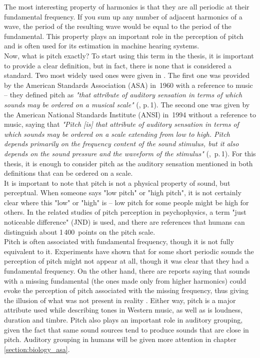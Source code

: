The most interesting property of harmonics is that they are all periodic at their fundamental frequency. If you sum up any number of adjacent harmonics of a wave, the period of the resulting wave would be equal to the period of the fundamental. This property plays an important role in the perception of pitch and is often used for its estimation in machine hearing systems.\\

Now, what is pitch exactly? To start using this term in the thesis, it is important to provide a clear definition, but in fact, there is none that is considered a standard. Two most widely used ones were given in \cite{Plack2005}. The first one was provided by the American Standards Association (ASA) in~1960 with a reference to music -- they defined pitch as \textit{"that attribute of auditory sensation in terms of which sounds may be ordered on a musical scale"} (\cite{Plack2005}, p.\,1). The second one was given by the American National Standards Institute (ANSI) in~1994 without a reference to music, saying that \textit{"Pitch [is] that attribute of auditory sensation in terms of which sounds may be ordered on a scale extending from low to high. Pitch depends primarily on the frequency content of the sound stimulus, but it also depends on the sound pressure and the waveform of the stimulus"} (\cite{Plack2005},~p.\,1). For this thesis, it is enough to consider pitch as the auditory sensation mentioned in both definitions that can be ordered on a scale.\\

It is important to note that pitch is not a physical property of sound, but perceptual. When someone says "low pitch" or "high pitch", it is not certainly clear where this "low" or "high" is -- low pitch for some people might be high for others. In the related studies of pitch perception in psychophysics, a term "just noticeable difference" (JND) is used, and there are references that humans can distinguish about 1\,400~points on the pitch scale.\\

Pitch is often associated with fundamental frequency, though it is not fully equivalent to it. Experiments have shown that for some short periodic sounds the perception of pitch might not appear at all, though it was clear that they had a fundamental frequency. On the other hand, there are reports saying that sounds with a missing fundamental (the ones made only from higher harmonics) could evoke the perception of pitch associated with the missing frequency, thus giving the illusion of what was not present in reality \cite{Schnupp2011}. Either way, pitch is a major attribute used while describing tones in Western music, as well as is loudness, duration and timbre. Pitch also plays an important role in auditory grouping, given the fact that same sound sources tend to produce sounds that are close in pitch. Auditory grouping in humans will be given more attention in chapter \ref{section:biology_asa}.

